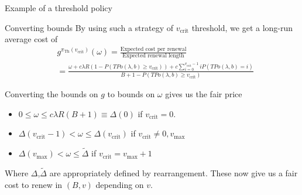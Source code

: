 \documentclass[10pt]{beamer}
\begin{document}
\begin{frame}{Example of a threshold policy}
\begin{myfigure}[H]
\begin{center}
{
}
\end{center}
\caption{Threshold policy, $\pi_{\text{Th}}(2)$, with \textcolor{blue}{$b_{j}=5$} and \textcolor{red}{$B_{j}=4$} (e.g. $X_{j} \leq 3.7$)}
\end{myfigure}
\end{frame}


\begin{frame}{Converting bounds}
By using such a strategy of $v_{\text{crit}}$ threshold, we get a long-run average cost of
\begin{align*}
&g^{\pi_{\text{Th}}(v_{\text{crit}})}(\omega)=\frac{\text{Expected cost per renewal}}{\text{Expected renewal length}} \\
&= \frac{\omega + c \lambda R (1-P(TPo(\lambda,b) \geq v_{\text{crit}})) + c \sum\limits_{i=0}^{v_{\text{crit}}-1} i P(TPo(\lambda,b)=i)}{B+1-P(TPo(\lambda,b) \geq v_{\text{crit}})}
\end{align*}

Converting the bounds on $g$ to bounds on $\omega$ gives us the fair price
\begin{itemize}
\item $0 \leq \omega \leq c \lambda R (B+1) \equiv \Delta(0)$ if $v_{\text{crit}}=0$.

\item $\Delta(v_{\text{crit}}-1) < \omega \leq  \Delta(v_{\text{crit}})$ if $v_{\text{crit}} \neq 0,v_{\text{max}}$

\item $\Delta(v_{\text{max}}) < \omega \leq \widetilde{\Delta}$ if $v_{\text{crit}}=v_{\text{max}}+1$
\end{itemize}
Where $\Delta$,$\widetilde{\Delta}$ are appropriately defined by rearrangement.
These now give us a fair cost to renew in $(B,v)$ depending on $v$.
\end{frame}
\end{document}
